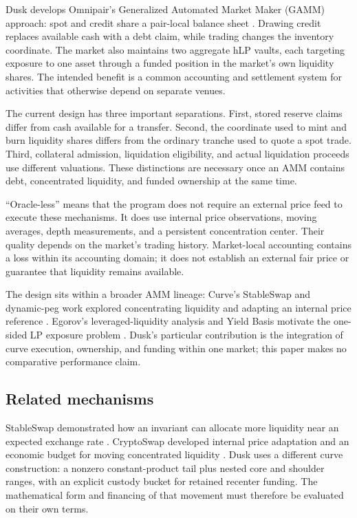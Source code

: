Dusk develops Omnipair's Generalized Automated Market Maker (GAMM) approach: spot and credit share a pair-local balance sheet \cite{omnipair-docs-gamm}. Drawing credit replaces available cash with a debt claim, while trading changes the inventory coordinate. The market also maintains two aggregate hLP vaults, each targeting exposure to one asset through a funded position in the market's own liquidity shares. The intended benefit is a common accounting and settlement system for activities that otherwise depend on separate venues.

The current design has three important separations. First, stored reserve claims differ from cash available for a transfer. Second, the coordinate used to mint and burn liquidity shares differs from the ordinary tranche used to quote a spot trade. Third, collateral admission, liquidation eligibility, and actual liquidation proceeds use different valuations. These distinctions are necessary once an AMM contains debt, concentrated liquidity, and funded ownership at the same time.

``Oracle-less'' means that the program does not require an external price feed to execute these mechanisms. It does use internal price observations, moving averages, depth measurements, and a persistent concentration center. Their quality depends on the market's trading history. Market-local accounting contains a loss within its accounting domain; it does not establish an external fair price or guarantee that liquidity remains available.

\ifexpanded\else
The design sits within a broader AMM lineage: Curve's StableSwap and dynamic-peg work explored concentrating liquidity and adapting an internal price reference \cite{curve-stableswap,curve-cryptopools}. Egorov's leveraged-liquidity analysis and Yield Basis motivate the one-sided LP exposure problem \cite{egorov-yieldbasis-whitepaper,yieldbasis-technical}. Dusk's particular contribution is the integration of curve execution, ownership, and funding within one market; this paper makes no comparative performance claim.
\fi

\ifexpanded
\subsection{Related mechanisms}

StableSwap demonstrated how an invariant can allocate more liquidity near an expected exchange rate \cite{curve-stableswap}. CryptoSwap developed internal price adaptation and an economic budget for moving concentrated liquidity \cite{curve-cryptopools}. Dusk uses a different curve construction: a nonzero constant-product tail plus nested core and shoulder ranges, with an explicit custody bucket for retained recenter funding. The mathematical form and financing of that movement must therefore be evaluated on their own terms.

